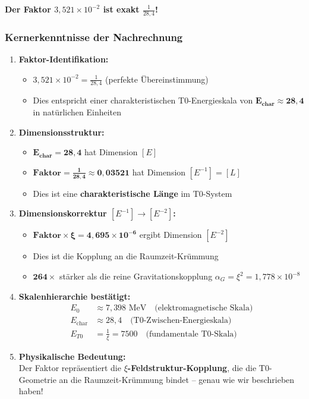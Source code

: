 \documentclass[11pt,a4paper]{article}
\begin{document}
\textbf{Der Faktor $3{,}521 \times 10^{-2}$ ist exakt $\frac{1}{28{,}4}$!}
\subsubsection{Kernerkenntnisse der Nachrechnung}

\begin{enumerate}
	\item \textbf{Faktor-Identifikation:}
	\begin{itemize}
		\item $3{,}521 \times 10^{-2} = \frac{1}{28{,}4}$ (perfekte Übereinstimmung)
		\item Dies entspricht einer charakteristischen T0-Energieskala von $\mathbf{E_{\text{char}} \approx 28{,}4}$ in natürlichen Einheiten
	\end{itemize}
	
	\item \textbf{Dimensionsstruktur:}
	\begin{itemize}
		\item $\mathbf{E_{\text{char}} = 28{,}4}$ hat Dimension $[E]$
		\item $\mathbf{\text{Faktor} = \frac{1}{28{,}4} \approx 0{,}03521}$ hat Dimension $[E^{-1}] = [L]$
		\item Dies ist eine \textbf{charakteristische Länge} im T0-System
	\end{itemize}
	
	\item \textbf{Dimensionskorrektur $[E^{-1}] \rightarrow [E^{-2}]$:}
	\begin{itemize}
		\item $\mathbf{\text{Faktor} \times \xi = 4{,}695 \times 10^{-6}}$ ergibt Dimension $[E^{-2}]$
		\item Dies ist die Kopplung an die Raumzeit-Krümmung
		\item $\mathbf{264\times}$ stärker als die reine Gravitationskopplung $\alpha_G = \xi^2 = 1{,}778 \times 10^{-8}$
	\end{itemize}
	
	\item \textbf{Skalenhierarchie bestätigt:}
	\begin{align}
		E_0 &\approx 7{,}398 \text{ MeV} \quad \text{(elektromagnetische Skala)} \\
		E_{\text{char}} &\approx 28{,}4 \quad \text{(T0-Zwischen-Energieskala)} \\
		E_{T0} &= \frac{1}{\xi} = 7500 \quad \text{(fundamentale T0-Skala)}
	\end{align}
	
	\item \textbf{Physikalische Bedeutung:}
	\\Der Faktor repräsentiert die \textbf{$\xi$-Feldstruktur-Kopplung}, die die T0-Geometrie an die Raumzeit-Krümmung bindet -- genau wie wir beschrieben haben!
\end{enumerate}
\end{document}
